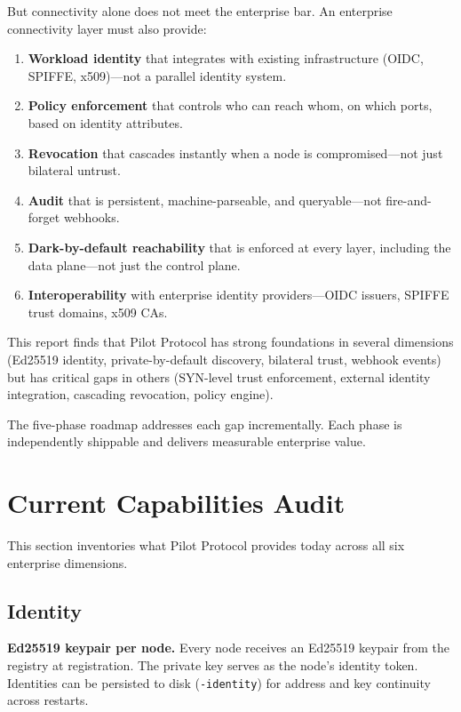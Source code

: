 \documentclass[11pt,a4paper]{article}
\begin{document}
But connectivity alone does not meet the enterprise bar. An enterprise connectivity layer must also provide:

\begin{enumerate}
    \item \textbf{Workload identity} that integrates with existing infrastructure (OIDC, SPIFFE, x509)---not a parallel identity system.
    \item \textbf{Policy enforcement} that controls who can reach whom, on which ports, based on identity attributes.
    \item \textbf{Revocation} that cascades instantly when a node is compromised---not just bilateral untrust.
    \item \textbf{Audit} that is persistent, machine-parseable, and queryable---not fire-and-forget webhooks.
    \item \textbf{Dark-by-default reachability} that is enforced at every layer, including the data plane---not just the control plane.
    \item \textbf{Interoperability} with enterprise identity providers---OIDC issuers, SPIFFE trust domains, x509 CAs.
\end{enumerate}

This report finds that Pilot Protocol has strong foundations in several dimensions (Ed25519 identity, private-by-default discovery, bilateral trust, webhook events) but has critical gaps in others (SYN-level trust enforcement, external identity integration, cascading revocation, policy engine).

The five-phase roadmap addresses each gap incrementally. Each phase is independently shippable and delivers measurable enterprise value.

\section{Current Capabilities Audit}

This section inventories what Pilot Protocol provides today across all six enterprise dimensions.

\subsection{Identity}

\textbf{Ed25519 keypair per node.} Every node receives an Ed25519 keypair from the registry at registration. The private key serves as the node's identity token. Identities can be persisted to disk (\texttt{-identity}) for address and key continuity across restarts.
\end{document}
